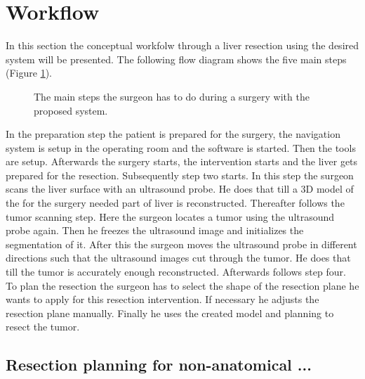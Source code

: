 \section{Workflow}
In this section the conceptual workfolw through a liver resection using the
desired system will be presented. The following flow diagram shows the five main
steps (Figure \ref{fig:conceptWorkflow}).
\begin{figure}[H]
  \centering
  \caption{The main steps the surgeon has to do during a surgery with the
    proposed system.}
  \label{fig:conceptWorkflow}
\end{figure}
In the preparation step the patient is prepared for the surgery, the
navigation system is setup in the operating room and the software is started.
Then the tools are setup. Afterwards the surgery starts, the intervention starts and the liver gets
prepared for the resection. Subsequently step two starts. In this step the
surgeon scans the liver surface with an ultrasound probe. He does that till a 3D
model of the for the surgery needed part of liver is reconstructed. Thereafter
follows the tumor scanning step. Here the surgeon locates a tumor using the
ultrasound probe again. Then he freezes the ultrasound image and initializes the
segmentation of it. After this the surgeon moves the ultrasound probe in
different directions such that the ultrasound images cut through the tumor. He
does that till the tumor is accurately enough reconstructed. Afterwards follows
step four. To plan the resection the surgeon has to select the shape of the
resection plane he wants to apply for this resection intervention. If necessary
he adjusts the resection plane manually. Finally he uses the created model and
planning to resect the tumor. 
\subsection{Resection planning for non-anatomical ...}

